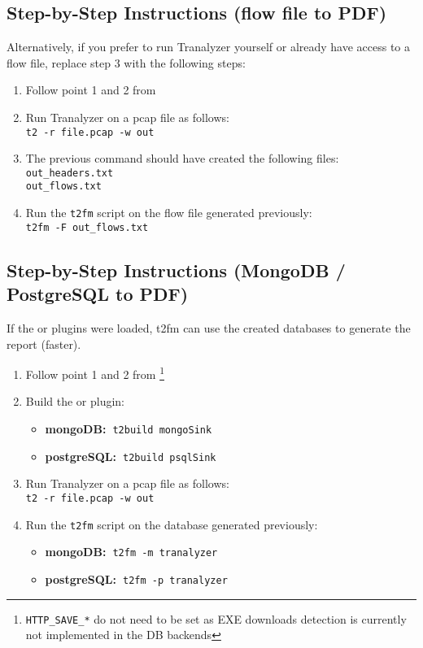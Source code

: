 \documentclass[documentation]{subfiles}
\begin{document}
\subsection{Step-by-Step Instructions (flow file to PDF)}
Alternatively, if you prefer to run Tranalyzer yourself or already have access to a flow file, replace step 3 with the following steps:
\begin{enumerate}
    \item Follow point 1 and 2 from 
    \item Run Tranalyzer on a pcap file as follows:\\
        {\tt t2 -r file.pcap -w out}
    \item The previous command should have created the following files:\\
        {\tt out\_headers.txt\\out\_flows.txt}
    \item Run the {\tt t2fm} script on the flow file generated previously:\\
        {\tt t2fm -F out\_flows.txt}
\end{enumerate}

\subsection{Step-by-Step Instructions (MongoDB / PostgreSQL to PDF)}
If the  or  plugins were loaded, t2fm can use the created databases to generate the report (faster).
\begin{enumerate}
    \item Follow point 1 and 2 from \footnote{{\tt HTTP\_SAVE\_*} do not need to be set as EXE downloads detection is currently not implemented in the DB backends}
    \item Build the  or  plugin:
        \begin{itemize}
            \item {\bf mongoDB:~}{\tt t2build mongoSink}\\
            \item {\bf postgreSQL:~}{\tt t2build psqlSink}\\
        \end{itemize}
    \item Run Tranalyzer on a pcap file as follows:\\
        {\tt t2 -r file.pcap -w out}
    \item Run the {\tt t2fm} script on the database generated previously:
        \begin{itemize}
            \item {\bf mongoDB:~}{\tt t2fm -m tranalyzer}
            \item {\bf postgreSQL:~}{\tt t2fm -p tranalyzer}
        \end{itemize}
\end{enumerate}
\end{document}

